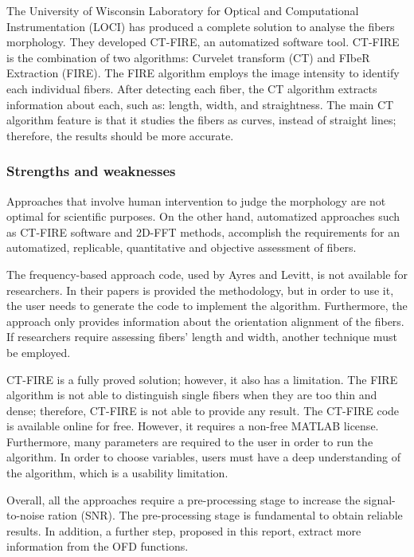 \documentclass[12pt,a4paper]{article}
\begin{document}
The University of Wisconsin Laboratory for Optical and Computational Instrumentation (LOCI) has produced a complete solution to analyse the fibers morphology. They developed CT-FIRE, an automatized software tool. CT-FIRE is the combination of two algorithms: Curvelet transform (CT) and FIbeR Extraction (FIRE). The FIRE algorithm employs the image intensity to identify each individual fibers. After detecting each fiber, the CT algorithm extracts information about each, such as: length, width, and straightness. The main CT algorithm feature is that it studies the fibers as curves, instead of straight lines; therefore, the results should be more accurate.

\subsubsection{Strengths and weaknesses}

Approaches that involve human intervention to judge the morphology are not optimal for scientific purposes. On the other hand, automatized approaches such as CT-FIRE software and 2D-FFT methods, accomplish the requirements for an automatized, replicable, quantitative and objective assessment of fibers.

The frequency-based approach code, used by Ayres and Levitt, is not available for researchers.  In their papers is provided the methodology, but in order to use it, the user needs to generate the code to implement the algorithm. Furthermore, the approach only provides information about the orientation alignment of the fibers. If researchers require assessing fibers' length and width, another technique must be employed.

CT-FIRE is a fully proved solution; however, it also has a limitation. The FIRE algorithm is not able to distinguish single fibers when they are too thin and dense; therefore, CT-FIRE is not able to provide any result. The CT-FIRE code is available online for free. However, it requires a non-free MATLAB license. Furthermore, many parameters are required to the user in order to run the algorithm. In order to choose variables, users must have a deep understanding of the algorithm, which is a usability limitation. 

Overall, all the approaches require a pre-processing stage to increase the signal-to-noise ration (SNR). The pre-processing stage is fundamental to obtain reliable results. In addition, a further step, proposed in this report,  extract more information from the  OFD functions.
\end{document}
